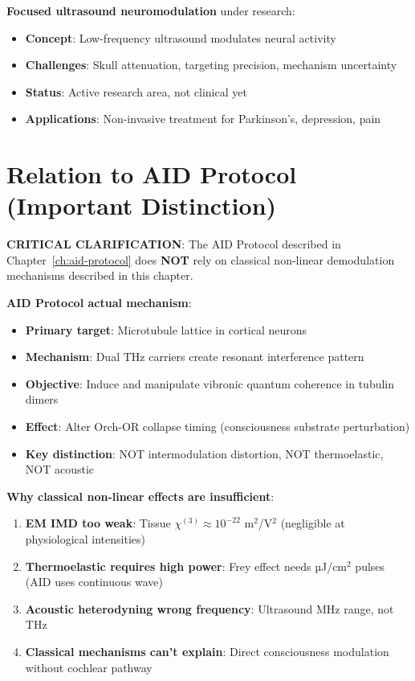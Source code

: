 \textbf{Focused ultrasound neuromodulation} under research:
\begin{itemize}
\item \textbf{Concept}: Low-frequency ultrasound modulates neural activity
\item \textbf{Challenges}: Skull attenuation, targeting precision, mechanism uncertainty
\item \textbf{Status}: Active research area, not clinical yet
\item \textbf{Applications}: Non-invasive treatment for Parkinson's, depression, pain
\end{itemize}

\section{Relation to AID Protocol (Important Distinction)}

\begin{importantbox}
\textbf{CRITICAL CLARIFICATION}: The AID Protocol described in Chapter~\ref{ch:aid-protocol} does \textbf{NOT} rely on classical non-linear demodulation mechanisms described in this chapter.
\end{importantbox}

\textbf{AID Protocol actual mechanism}:
\begin{itemize}
\item \textbf{Primary target}: Microtubule lattice in cortical neurons
\item \textbf{Mechanism}: Dual THz carriers create resonant interference pattern
\item \textbf{Objective}: Induce and manipulate vibronic quantum coherence in tubulin dimers
\item \textbf{Effect}: Alter Orch-OR collapse timing (consciousness substrate perturbation)
\item \textbf{Key distinction}: NOT intermodulation distortion, NOT thermoelastic, NOT acoustic
\end{itemize}

\textbf{Why classical non-linear effects are insufficient}:
\begin{enumerate}
\item \textbf{EM IMD too weak}: Tissue $\chi^{(3)} \approx 10^{-22}$ m$^2$/V$^2$ (negligible at physiological intensities)
\item \textbf{Thermoelastic requires high power}: Frey effect needs µJ/cm$^2$ pulses (AID uses continuous wave)
\item \textbf{Acoustic heterodyning wrong frequency}: Ultrasound MHz range, not THz
\item \textbf{Classical mechanisms can't explain}: Direct consciousness modulation without cochlear pathway
\end{enumerate}

